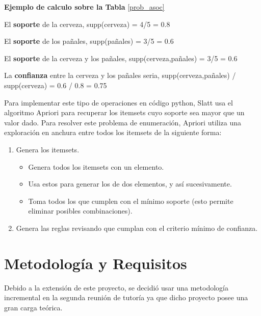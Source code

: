 \documentclass{cosas/tfg_domingo}
\begin{document}
\begin{tcolorbox}[colback=red!5!white,colframe=red!75!black]
  \textbf{Ejemplo de calculo sobre la Tabla} \ref{prob_asoc}

  El \textbf{soporte} de la cerveza, supp(cerveza) = 4/5 = 0.8
  
  El \textbf{soporte} de los pañales, supp(pañales) = 3/5 = 0.6
  
  El \textbf{soporte} de la cerveza y los pañales, supp(cerveza,pañales) = 3/5 = 0.6
  
  La \textbf{confianza} entre la cerveza y los pañales seria, supp(cerveza,pañales) / supp(cerveza) = 0.6 / 0.8 = 0.75
  
\end{tcolorbox}

Para implementar este tipo de operaciones en código python, Slatt usa el algoritmo Apriori para recuperar los itemsets cuyo soporte sea mayor que un valor dado. Para resolver este problema de enumeración, Apriori utiliza una exploración en anchura entre todos los itemsets de la siguiente forma: \citep{aggarwal2015data}

\begin{enumerate}
    \item Genera los itemsets.
    \begin{itemize}
        \item Genera todos los itemsets con un elemento.
        \item Usa estos para generar los de dos elementos, y así sucesivamente.
        \item Toma todos los que cumplen con el mínimo soporte (esto permite eliminar posibles combinaciones).
    \end{itemize}
    \item Genera las reglas revisando que cumplan con el criterio mínimo de confianza.
\end{enumerate}







\newpage
\section{Metodología y Requisitos}

Debido a la extensión de este proyecto, se decidió usar una metodología incremental en la segunda reunión de tutoría ya que dicho proyecto posee una gran carga teórica.
\end{document}
